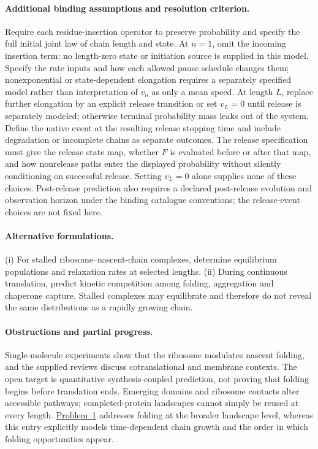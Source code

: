 \documentclass[11pt]{article}
\begin{document}
\paragraph{Additional binding assumptions and resolution criterion.} Require each residue-insertion operator to preserve probability and specify the full initial joint law of chain length and state. At $n=1$, omit the incoming insertion term: no length-zero state or initiation source is supplied in this model. Specify the rate inputs and how each allowed pause schedule changes them; nonexponential or state-dependent elongation requires a separately specified model rather than interpretation of $v_n$ as only a mean speed. At length $L$, replace further elongation by an explicit release transition or set $v_L=0$ until release is separately modeled; otherwise terminal probability mass leaks out of the system. Define the native event at the resulting release stopping time and include degradation or incomplete chains as separate outcomes. The release specification must give the release state map, whether $F$ is evaluated before or after that map, and how nonrelease paths enter the displayed probability without silently conditioning on successful release. Setting $v_L=0$ alone supplies none of these choices. Post-release prediction also requires a declared post-release evolution and observation horizon under the binding catalogue conventions; the release-event choices are not fixed here.

\paragraph{Alternative formulations.} (i) For stalled ribosome--nascent-chain complexes, determine equilibrium populations and relaxation rates at selected lengths. (ii) During continuous translation, predict kinetic competition among folding, aggregation and chaperone capture. Stalled complexes may equilibrate and therefore do not reveal the same distributions as a rapidly growing chain.
\paragraph{Obstructions and partial progress.} Single-molecule experiments show that the ribosome modulates nascent folding, and the supplied reviews discuss cotranslational and membrane contexts. The open target is quantitative synthesis-coupled prediction, not proving that folding begins before translation ends. Emerging domains and ribosome contacts alter accessible pathways; completed-protein landscapes cannot simply be reused at every length. \href{https://we-solve.github.io/problems/in-cell-protein-folding-landscape-58890e94/}{Problem~1} addresses folding at the broader landscape level, whereas this entry explicitly models time-dependent chain growth and the order in which folding opportunities appear.
\end{document}
